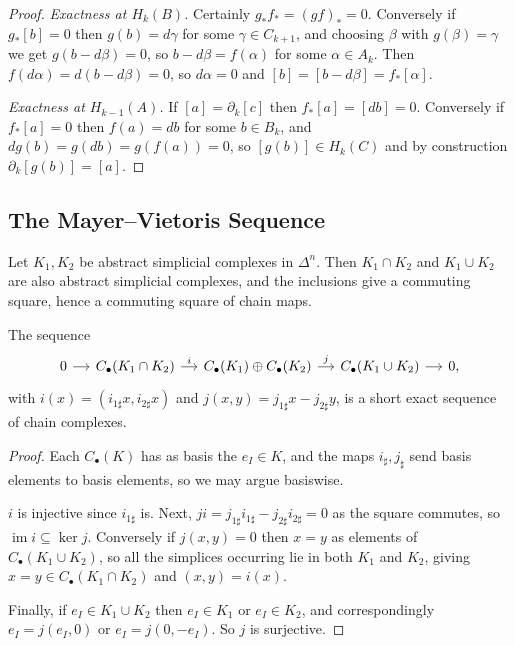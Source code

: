 \begin{proof}
	\emph{Exactness at $H_k(B)$.} Certainly $g_*f_* = (gf)_* = 0$. Conversely if $g_*[b] = 0$ then $g(b) = d\gamma$ for some $\gamma \in C_{k+1}$, and choosing $\beta$ with $g(\beta) = \gamma$ we get $g(b - d\beta) = 0$, so $b - d\beta = f(\alpha)$ for some $\alpha \in A_k$. Then $f(d\alpha) = d(b-d\beta) = 0$, so $d\alpha = 0$ and $[b] = [b - d\beta] = f_*[\alpha]$.

	\emph{Exactness at $H_{k-1}(A)$.} If $[a] = \partial_k[c]$ then $f_*[a] = [db] = 0$. Conversely if $f_*[a] = 0$ then $f(a) = db$ for some $b \in B_k$, and $dg(b) = g(db) = g(f(a)) = 0$, so $[g(b)] \in H_k(C)$ and by construction $\partial_k[g(b)] = [a]$.
\end{proof}

\subsection{The Mayer--Vietoris Sequence}

Let $K_1, K_2$ be abstract simplicial complexes in $\Delta^n$. Then $K_1\cap K_2$ and
$K_1 \cup K_2$ are also abstract simplicial complexes, and the inclusions give a
commuting square, hence a commuting square of chain maps.

\begin{proposition} \label{prop:mv-ses}
	The sequence
	\[\begin{tikzcd}[column sep=small]
		0 \arrow[r] & {C_\bullet(K_1\cap K_2)} \arrow[r, "i"] & {C_\bullet(K_1)\oplus C_\bullet(K_2)} \arrow[r, "j"] & {C_\bullet(K_1\cup K_2)} \arrow[r] & 0,
	\end{tikzcd}\]
	with $i(x) = (i_{1\sharp}x, i_{2\sharp}x)$ and $j(x,y) = j_{1\sharp}x - j_{2\sharp}y$, is a short exact sequence of chain complexes.
\end{proposition}
\begin{proof}
	Each $C_\bullet(K)$ has as basis the $e_I \in K$, and the maps $i_\sharp, j_\sharp$ send basis elements to basis elements, so we may argue basiswise.

	$i$ is injective since $i_{1\sharp}$ is. Next, $ji = j_{1\sharp}i_{1\sharp} - j_{2\sharp}i_{2\sharp} = 0$ as the square commutes, so $\operatorname{im}i \subseteq \ker j$. Conversely if $j(x,y) = 0$ then $x = y$ as elements of $C_\bullet(K_1\cup K_2)$, so all the simplices occurring lie in both $K_1$ and $K_2$, giving $x = y \in C_\bullet(K_1\cap K_2)$ and $(x,y) = i(x)$.

	Finally, if $e_I \in K_1\cup K_2$ then $e_I \in K_1$ or $e_I \in K_2$, and correspondingly $e_I = j(e_I, 0)$ or $e_I = j(0,-e_I)$. So $j$ is surjective.
\end{proof}

